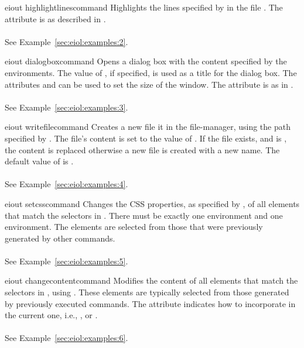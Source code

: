 \bigskip
\xmlstruct
{eiout}
{highlightlinescommand}
{%
%
  Highlights the lines specified by  in the
  file . The attribute  is
  as described in .
%
  \\\\See Example~\ref{sec:eiol:examples:2}.
}

\bigskip
\xmlstruct
{eiout}
{dialogboxcommand}
{%
  Opens a dialog box with the content specified by the
   environments. The value of
  , if specified, is used as a title for the
  dialog box. The attributes  and
   can be used to set the size of the window.
  The attribute  is as in
  .
%
  \\\\See Example~\ref{sec:eiol:examples:3}.
}


\bigskip 
\xmlstruct 
{eiout}
{writefilecommand} 
{%
%
  Creates a new file it in the file-manager, using the path specified
  by . The file's content is set to the value
  of . If the file exists, and
   is , the content is
  replaced otherwise a new file is created with a new name. The
  default value of  is
  .
% 
%
  \\\\See Example~\ref{sec:eiol:examples:4}.
}


\bigskip
\xmlstruct
{eiout}
{setcsscommand}
{%
%
  Changes the CSS properties, as specified by
  , of all elements that match the
  selectors in .
%
  There must be exactly one  environment and
  one  environment. 
%
  The elements are selected from those that were previously generated
  by other commands.
%
  \\\\See Example~\ref{sec:eiol:examples:5}.
}

\bigskip
\xmlstruct
{eiout}
{changecontentcommand}
{%
% 
  Modifies the content of all elements that match the selectors in
  , using
  . These elements are typically selected
  from those generated by previously executed commands.
%
  The attribute  indicates how to incorporate
   in the current one, i.e.,
  ,  or
  .
%
  \\\\See Example~\ref{sec:eiol:examples:6}.
}

